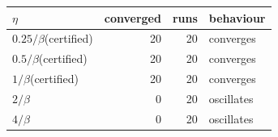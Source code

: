 \begin{tabular}{l rr l}
\toprule
$\eta$ & converged & runs & behaviour \\
\midrule
$0.25/\beta$\;(certified) & 20 & 20 & converges \\
$0.5/\beta$\;(certified) & 20 & 20 & converges \\
$1/\beta$\;(certified) & 20 & 20 & converges \\
$2/\beta$ & 0 & 20 & oscillates \\
$4/\beta$ & 0 & 20 & oscillates \\
\bottomrule
\end{tabular}
